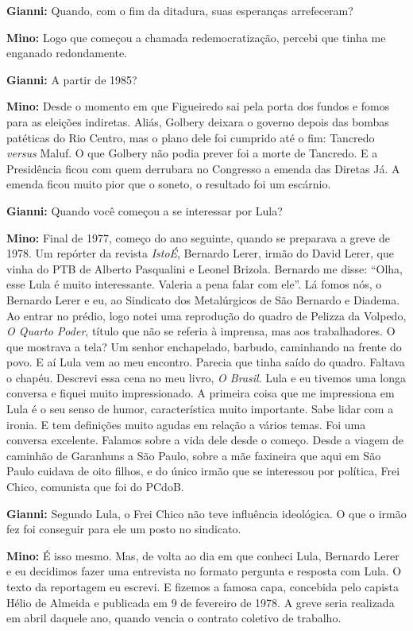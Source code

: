\textbf{Gianni:} Quando, com o fim da ditadura, suas esperanças
arrefeceram?

\textbf{Mino:} Logo que começou a chamada redemocratização, percebi que
tinha me enganado redondamente.

\textbf{Gianni:} A partir de 1985?

\textbf{Mino:} Desde o momento em que Figueiredo sai pela porta dos
fundos e fomos para as eleições indiretas. Aliás, Golbery deixara o
governo depois das bombas patéticas do Rio Centro, mas o plano dele foi
cumprido até o fim: Tancredo \emph{versus} Maluf. O que Golbery não
podia prever foi a morte de Tancredo. E a Presidência ficou com quem
derrubara no Congresso a emenda das Diretas Já. A emenda ficou muito
pior que o soneto, o resultado foi um escárnio.

\textbf{Gianni:} Quando você começou a se interessar por Lula?

\textbf{Mino:} Final de 1977, começo do ano seguinte, quando se
preparava a greve de 1978. Um repórter da revista \emph{IstoÉ}, Bernardo
Lerer, irmão do David Lerer, que vinha do PTB de Alberto Pasqualini e
Leonel Brizola. Bernardo me disse: ``Olha, esse Lula é muito
interessante. Valeria a pena falar com ele''. Lá fomos nós, o Bernardo
Lerer e eu, ao Sindicato dos Metalúrgicos de São Bernardo e Diadema. Ao
entrar no prédio, logo notei uma reprodução do quadro de Pelizza da
Volpedo, \emph{O Quarto Poder}, título que não se referia à imprensa,
mas aos trabalhadores. O que mostrava a tela? Um senhor enchapelado,
barbudo, caminhando na frente do povo. E aí Lula vem ao meu encontro.
Parecia que tinha saído do quadro. Faltava o chapéu. Descrevi essa cena
no meu livro, \emph{O Brasil}. Lula e eu tivemos uma longa conversa e
fiquei muito impressionado. A primeira coisa que me impressiona em Lula
é o seu senso de humor, característica muito importante. Sabe lidar com
a ironia. E tem definições muito agudas em relação a vários temas. Foi
uma conversa excelente. Falamos sobre a vida dele desde o começo. Desde
a viagem de caminhão de Garanhuns a São Paulo, sobre a mãe faxineira que
aqui em São Paulo cuidava de oito filhos, e do único irmão que se
interessou por política, Frei Chico, comunista que foi do PCdoB.

\textbf{Gianni:} Segundo Lula, o Frei Chico não teve influência
ideológica. O que o irmão fez foi conseguir para ele um posto no
sindicato.

\textbf{Mino:} É isso mesmo. Mas, de volta ao dia em que conheci Lula,
Bernardo Lerer e eu decidimos fazer uma entrevista no formato pergunta e
resposta com Lula. O texto da reportagem eu escrevi. E fizemos a famosa
capa, concebida pelo capista Hélio de Almeida e publicada em 9 de
fevereiro de 1978. A greve seria realizada em abril daquele ano, quando
vencia o contrato coletivo de trabalho.

